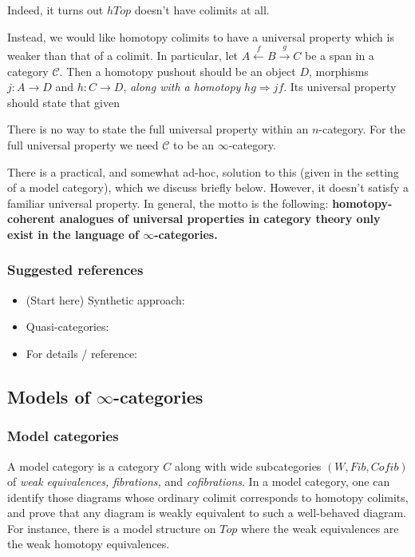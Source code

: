 Indeed, it turns out $hTop$ doesn't have colimits at all.

Instead, we would like homotopy colimits to have a universal property which is weaker than that of a colimit. In particular, let $A\xleftarrow{f} B\xrightarrow{g} C$ be a span in a category $\mathcal{C}$. Then a homotopy pushout should be an object $D$, morphisms $j:A\rightarrow D$ and $h:C\rightarrow D$, \textit{along with a homotopy} $hg\Rightarrow jf$. Its universal property should state that given 

There is no way to state the full universal property within an $n$-category. For the full universal property we need $\mathcal{C}$ to be an $\infty$-category.

There is a practical, and somewhat ad-hoc, solution to this (given in the setting of a model category), which we discuss briefly below. However, it doesn't satisfy a familiar universal property. In general, the motto is the following: \textbf{homotopy-coherent analogues of universal properties in category theory only exist in the language of $\infty$-categories.}

\subsubsection{Suggested references}
\begin{itemize}
    \item (Start here) Synthetic approach: \cite{Haugseng-categories-intro}
    \item Quasi-categories: \cite{Land}
    \item For details / reference: \cite{HTT}
\end{itemize}

\subsection{Models of $\infty$-categories}
\subsubsection{Model categories}
A model category is a category $C$ along with wide subcategories $(W,Fib,Cofib)$ of \textit{weak equivalences, fibrations,} and \textit{cofibrations}. In a model category, one can identify those diagrams whose ordinary colimit corresponds to homotopy colimits, and prove that any diagram is weakly equivalent to such a well-behaved diagram. For instance, there is a model structure on $Top$ where the weak equivalences are the weak homotopy equivalences.

